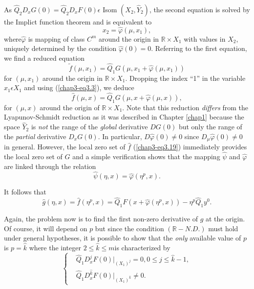 As $\hat{Q}_{2}D_{x}G(0) = \hat{Q}_{2} D_{x}F(0) \epsilon$ Isom
$(X_{2}, \hat{Y}_{2})$, the second equation is solved by the Implict
function theorem and is equivalent to 
$$
x_{2} = \hat{\varphi} (\mu, x_{1}),
$$
where\pageoriginale $\hat{\varphi}$ is mapping of class $C^{m}$ around
the origin in $\mathbb{R} \times X_{1}$ with values in $X_{2}$,
uniquely determined by the condition $\hat{\varphi}(0) = 0$. Referring
to the first equation, we find a reduced equation
$$
\widetilde{f}(\mu, x_{1}) = \hat{Q}_{1}G(\mu, x_{1} +
\hat{\varphi}(\mu, x_{1}))
$$
for $(\mu, x_{1})$ around the origin in $\mathbb{R} \times
X_{1}$. Dropping the index ``1'' in the variable $x_{1} \epsilon
X_{1}$ and using (\ref{chap3-eq3.3}), we deduce
\begin{equation*}
\hat{f}(\mu, x) = \hat{Q}_{1}G(\mu, x + \hat{\varphi}(\mu, x)),\tag{3.19}\label{chap3-eq3.19}
\end{equation*}
for $(\mu, x)$ around the origin of $\mathbb{R} \times X_{1}$. Note
that this reduction {\em differs} from the Lyapunov-Schmidt reduction
as it was described in Chapter \ref{chap1} because the space
$\hat{Y}_{2}$ is {\em not} the range of the {\em global} derivative
$DG(0)$ but only the range of the {\em partial} derivative
$D_{x}G(0)$. In particular, $D\hat{\varphi}(0) \neq 0$ since $D_{\mu}
\hat{\varphi}(0) \neq 0$ in general. However, the local zero set of
$\hat{f}$ (\ref{chap3-eq3.19}) immediately provides the local zero set
of $G$ and a simple verification shows that the mapping $\hat{\psi}$ and
$\hat{\varphi}$ are linked through the relation
$$
\hat{\psi}(\eta, x) = \hat{\varphi}(\eta^{p}, x).
$$ 

It follows that
$$
\hat{g}(\eta, x) = \hat{f}(\eta^{p}, x) = \hat{Q}_{1}F(x +
\hat{\varphi}(\eta^{p}, x)) - \eta^{p}\hat{Q}_{1}y^{0}.
$$

Again, the problem now is to find the first non-zero derivative of
$\hat{g}$ at the origin. Of course, it will depend on $p$ but since the
condition $(\mathbb{R}-N.D.)$ must hold under general hypotheses, it
is possible to show that the {\em only} available value of $p$ is $p =
\hat{k}$ where the integer $2 \leq \hat{k} \leq m$\pageoriginale is
characterized by
\begin{equation*}
\begin{cases}
& \hat{Q}_{1}D_{x}^{j}F(0) |_{(X_{1})^{j}} = 0, 0 \leq j \leq
  \hat{k}-1,\\
& \hat{Q}_{1} D_{x}^{\hat{k}}F(0) |_{(X_{1})^{\hat{k}}} \neq 0.
\end{cases}\tag{3.20}\label{chap3-eq3.20}
\end{equation*}

